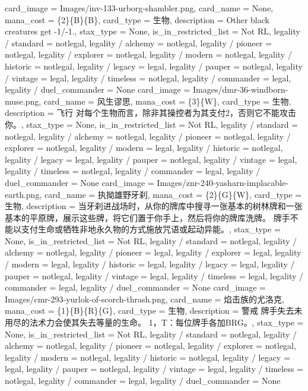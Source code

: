 \documentclass[lang = cn, color = black, 10pt]{AllThatStax}
\begin{document}
\card
{
	card_image = Images/inv-133-urborg-shambler.png,
	card_name = None,
	mana_cost = \{2\}\{B\}\{B\},
	card_type = 生物,
	description = Other black creatures get -1/-1.,
	stax_type = None,
	is_in_restricted_list = Not RL,
	legality / standard = notlegal,
	legality / alchemy = notlegal,
	legality / pioneer = notlegal,
	legality / explorer = notlegal,
	legality / modern = notlegal,
	legality / historic = notlegal,
	legality / legacy = legal,
	legality / pauper = notlegal,
	legality / vintage = legal,
	legality / timeless = notlegal,
	legality / commander = legal,
	legality / duel_commander = None
}
\card
{
	card_image = Images/dmr-36-windborn-muse.png,
	card_name = 风生谬思,
	mana_cost = \{3\}\{W\},
	card_type = 生物,
	description = 飞行
	对每个生物而言，除非其操控者为其支付{2}，否则它不能攻击你。,
	stax_type = None,
	is_in_restricted_list = Not RL,
	legality / standard = notlegal,
	legality / alchemy = notlegal,
	legality / pioneer = notlegal,
	legality / explorer = notlegal,
	legality / modern = legal,
	legality / historic = notlegal,
	legality / legacy = legal,
	legality / pauper = notlegal,
	legality / vintage = legal,
	legality / timeless = notlegal,
	legality / commander = legal,
	legality / duel_commander = None
}
\card
{
	card_image = Images/znr-240-yasharn-implacable-earth.png,
	card_name = 执拗雄野牙刹,
	mana_cost = \{2\}\{G\}\{W\},
	card_type = 生物,
	description = 当牙刹进战场时，从你的牌库中搜寻一张基本的树林牌和一张基本的平原牌，展示这些牌，将它们置于你手上，然后将你的牌库洗牌。
	牌手不能以支付生命或牺牲非地永久物的方式施放咒语或起动异能。,
	stax_type = None,
	is_in_restricted_list = Not RL,
	legality / standard = notlegal,
	legality / alchemy = notlegal,
	legality / pioneer = legal,
	legality / explorer = legal,
	legality / modern = legal,
	legality / historic = legal,
	legality / legacy = legal,
	legality / pauper = notlegal,
	legality / vintage = legal,
	legality / timeless = legal,
	legality / commander = legal,
	legality / duel_commander = None
}
\card
{
	card_image = Images/cmr-293-yurlok-of-scorch-thrash.png,
	card_name = 焰击族的尤洛克,
	mana_cost = \{1\}\{B\}\{R\}\{G\},
	card_type = 生物,
	description = 警戒
	牌手失去未用尽的法术力会使其失去等量的生命。
	{1}，{T}：每位牌手各加{B}{R}{G}。,
	stax_type = None,
	is_in_restricted_list = Not RL,
	legality / standard = notlegal,
	legality / alchemy = notlegal,
	legality / pioneer = notlegal,
	legality / explorer = notlegal,
	legality / modern = notlegal,
	legality / historic = notlegal,
	legality / legacy = legal,
	legality / pauper = notlegal,
	legality / vintage = legal,
	legality / timeless = notlegal,
	legality / commander = legal,
	legality / duel_commander = None
}
\end{document}

